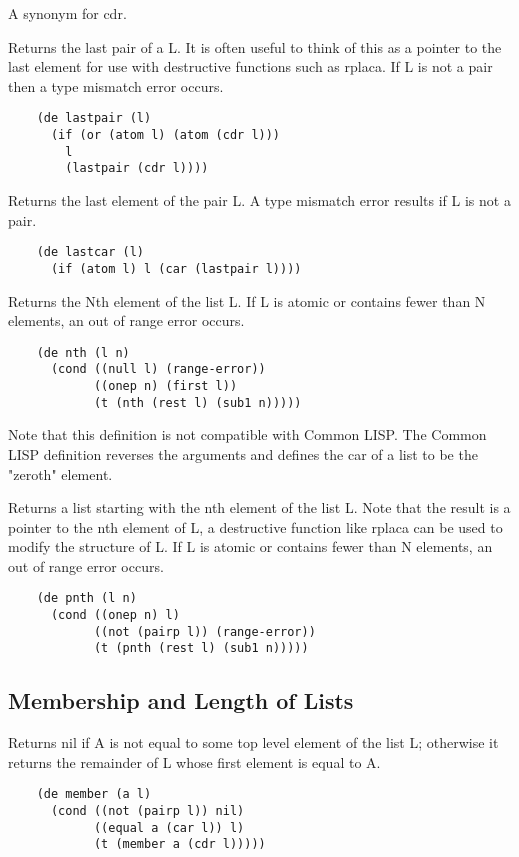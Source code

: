 {    A synonym for cdr.
}

{    Returns the last pair of a L.   It is often useful to  think
    of  this  as  a  pointer  to  the  last element for use with
    destructive functions such as rplaca.  If L is  not  a  pair
    then a type mismatch error occurs.
}
\begin{verbatim}
    (de lastpair (l)
      (if (or (atom l) (atom (cdr l)))
        l
        (lastpair (cdr l))))
\end{verbatim}

{    Returns  the  last  element  of the pair L.  A type mismatch
    error results if L is not a pair.
}
\begin{verbatim}
    (de lastcar (l)
      (if (atom l) l (car (lastpair l))))
\end{verbatim}

{    Returns the Nth element of the list L.  If L  is  atomic  or
    contains  fewer  than  N  elements,  an  out  of range error
    occurs.
}
\begin{verbatim}
    (de nth (l n)
      (cond ((null l) (range-error))
            ((onep n) (first l))
            (t (nth (rest l) (sub1 n)))))
\end{verbatim}
    Note that this definition  is  not  compatible  with  Common
    LISP.  The Common LISP definition reverses the arguments and
    defines the car of a list to be the "zeroth" element.


{    Returns  a list starting with the nth element of the list L.
    Note that the result is a pointer to the nth element of L, a
    destructive function like rplaca can be used to  modify  the
    structure  of  L.    If L is atomic or contains fewer than N
    elements,  an out of range error occurs.
}
\begin{verbatim}
    (de pnth (l n)
      (cond ((onep n) l)
            ((not (pairp l)) (range-error))
            (t (pnth (rest l) (sub1 n)))))
\end{verbatim}
\subsection{Membership and Length of Lists}


{    Returns nil if A is not equal to some top level  element  of
    the  list  L;  otherwise it returns the remainder of L whose
    first element is equal to A.
}
\begin{verbatim}
    (de member (a l)
      (cond ((not (pairp l)) nil)
            ((equal a (car l)) l)
            (t (member a (cdr l)))))
\end{verbatim}

